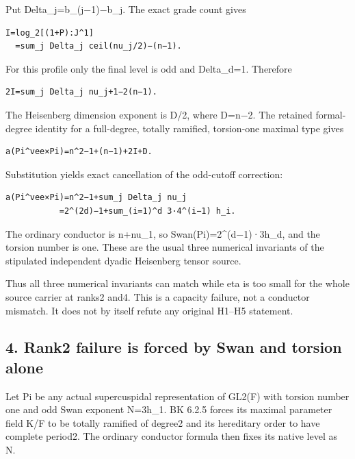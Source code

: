 Put Delta\_j=b\_(j−1)−b\_j. The exact grade count gives

\begin{Verbatim}[fontsize=\small,breaklines=true,breakanywhere=true]
I=log_2[(1+P):J^1]
  =sum_j Delta_j ceil(nu_j/2)−(n−1).
\end{Verbatim}

For this profile only the final level is odd and Delta\_d=1. Therefore

\begin{Verbatim}[fontsize=\small,breaklines=true,breakanywhere=true]
2I=sum_j Delta_j nu_j+1−2(n−1).
\end{Verbatim}

The Heisenberg dimension exponent is D/2, where D=n−2. The retained
formal-degree identity for a full-degree, totally ramified, torsion-one
maximal type gives

\begin{Verbatim}[fontsize=\small,breaklines=true,breakanywhere=true]
a(Pi^vee×Pi)=n^2−1+(n−1)+2I+D.
\end{Verbatim}

Substitution yields exact cancellation of the odd-cutoff correction:

\begin{Verbatim}[fontsize=\small,breaklines=true,breakanywhere=true]
a(Pi^vee×Pi)=n^2−1+sum_j Delta_j nu_j
           =2^(2d)−1+sum_(i=1)^d 3·4^(i−1) h_i.
\end{Verbatim}

The ordinary conductor is n+nu\_1, so Swan(Pi)=2\^{}(d−1)·3h\_d, and the
torsion number is one. These are the usual three numerical invariants of
the stipulated independent dyadic Heisenberg tensor source.

Thus all three numerical invariants can match while eta is too small for
the whole source carrier at ranks2 and4. This is a capacity failure, not
a conductor mismatch. It does not by itself refute any original H1--H5
statement.

\hypertarget{dyadic_capacity-rank2-failure-is-forced-by-swan-and-torsion-alone}{%
\subsection{4. Rank2 failure is forced by Swan and torsion
alone}\label{dyadic_capacity-rank2-failure-is-forced-by-swan-and-torsion-alone}}

Let Pi be any actual supercuspidal representation of GL2(F) with torsion
number one and odd Swan exponent N=3h\_1. BK 6.2.5 forces its maximal
parameter field K/F to be totally ramified of degree2 and its hereditary
order to have complete period2. The ordinary conductor formula then
fixes its native level as N.

